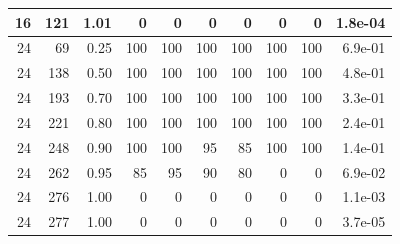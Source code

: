 \begin{tabular}{r r r rr rr rr r}
16 & 121 & 1.01 & 0 & 0 & 0 & 0 & 0 & 0 & 1.8e-04 \\
\midrule
24 & 69 & 0.25 & 100 & 100 & 100 & 100 & 100 & 100 & 6.9e-01 \\
24 & 138 & 0.50 & 100 & 100 & 100 & 100 & 100 & 100 & 4.8e-01 \\
24 & 193 & 0.70 & 100 & 100 & 100 & 100 & 100 & 100 & 3.3e-01 \\
24 & 221 & 0.80 & 100 & 100 & 100 & 100 & 100 & 100 & 2.4e-01 \\
24 & 248 & 0.90 & 100 & 100 & 95 & 85 & 100 & 100 & 1.4e-01 \\
24 & 262 & 0.95 & 85 & 95 & 90 & 80 & 0 & 0 & 6.9e-02 \\
24 & 276 & 1.00 & 0 & 0 & 0 & 0 & 0 & 0 & 1.1e-03 \\
24 & 277 & 1.00 & 0 & 0 & 0 & 0 & 0 & 0 & 3.7e-05 \\
\bottomrule
\end{tabular}

